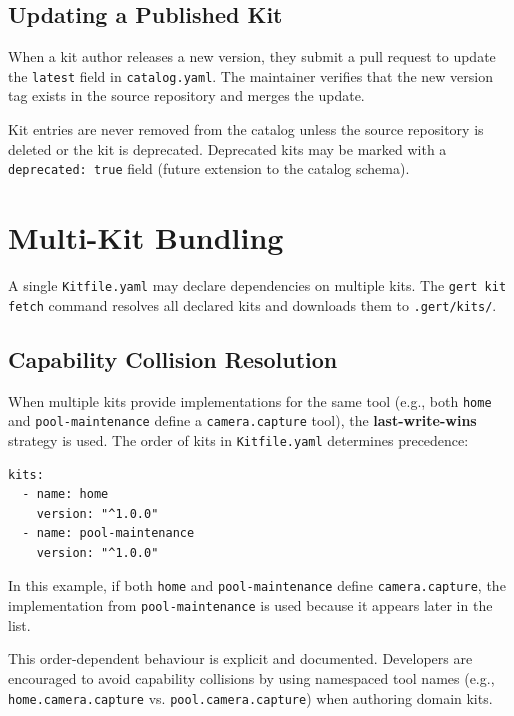 \subsection{Updating a Published Kit}

When a kit author releases a new version, they submit a pull request to update the \texttt{latest} field in \texttt{catalog.yaml}. The maintainer verifies that the new version tag exists in the source repository and merges the update.

Kit entries are never removed from the catalog unless the source repository is deleted or the kit is deprecated. Deprecated kits may be marked with a \texttt{deprecated: true} field (future extension to the catalog schema).

\section{Multi-Kit Bundling}
\label{sec:multi-kit}

A single \texttt{Kitfile.yaml} may declare dependencies on multiple kits. The \texttt{gert kit fetch} command resolves all declared kits and downloads them to \texttt{.gert/kits/}.

\subsection{Capability Collision Resolution}

When multiple kits provide implementations for the same tool (e.g., both \texttt{home} and \texttt{pool-maintenance} define a \texttt{camera.capture} tool), the \textbf{last-write-wins} strategy is used. The order of kits in \texttt{Kitfile.yaml} determines precedence:

\begin{verbatim}
kits:
  - name: home
    version: "^1.0.0"
  - name: pool-maintenance
    version: "^1.0.0"
\end{verbatim}

In this example, if both \texttt{home} and \texttt{pool-maintenance} define \texttt{camera.capture}, the implementation from \texttt{pool-maintenance} is used because it appears later in the list.

This order-dependent behaviour is explicit and documented. Developers are encouraged to avoid capability collisions by using namespaced tool names (e.g., \texttt{home.camera.capture} vs. \texttt{pool.camera.capture}) when authoring domain kits.

